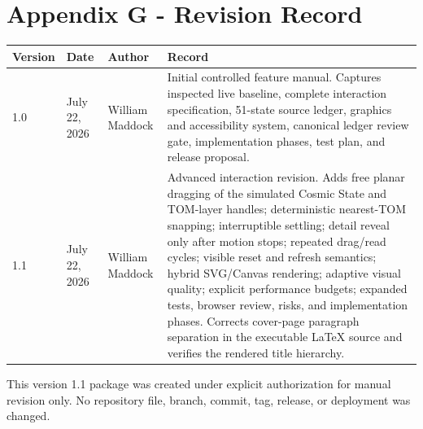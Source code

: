 \documentclass[11pt,letterpaper]{article}
\begin{document}
\section{Appendix G - Revision Record}
\begin{tabularx}{\textwidth}{L{0.75in}L{1.15in}L{1.3in}Y}
\toprule
\textbf{Version} & \textbf{Date} & \textbf{Author} & \textbf{Record} \\
 & July 22, 2026 & William Maddock & Initial controlled feature manual. Captures inspected live baseline, complete interaction specification, 51-state source ledger, graphics and accessibility system, canonical ledger review gate, implementation phases, test plan, and release proposal. \\
1.1 & July 22, 2026 & William Maddock & Advanced interaction revision. Adds free planar dragging of the simulated Cosmic State and TOM-layer handles; deterministic nearest-TOM snapping; interruptible settling; detail reveal only after motion stops; repeated drag/read cycles; visible reset and refresh semantics; hybrid SVG/Canvas rendering; adaptive visual quality; explicit performance budgets; expanded tests, browser review, risks, and implementation phases. Corrects cover-page paragraph separation in the executable LaTeX source and verifies the rendered title hierarchy. \\
\bottomrule
\end{tabularx}

\begin{authoringbox}
This version 1.1 package was created under explicit authorization for manual revision only. No repository file, branch, commit, tag, release, or deployment was changed.
\end{authoringbox}
\end{document}
